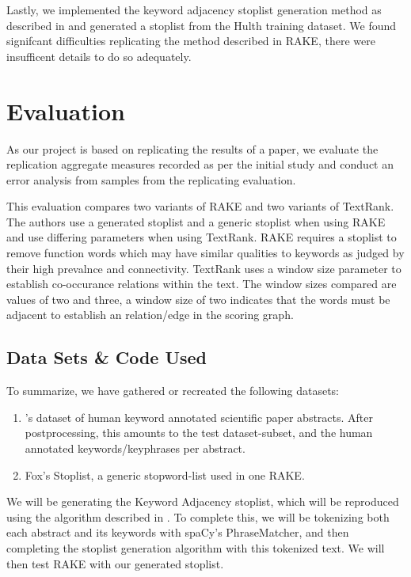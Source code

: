 \documentclass[11pt,a4paper]{article}
\begin{document}
Lastly, we implemented the keyword adjacency stoplist generation method as described in \citet{1} and generated a stoplist from the Hulth training dataset. We found signifcant difficulties replicating the method described in RAKE, there were insufficent details to do so adequately.  

\section{Evaluation}

As our project is based on replicating the results of a paper, we evaluate the replication aggregate measures recorded as per the initial study and conduct an error analysis from samples from the replicating evaluation. 

This evaluation compares two variants of RAKE and two variants of TextRank. The authors use a generated stoplist and a generic stoplist when using RAKE and use differing parameters when using TextRank. RAKE requires a stoplist to remove function words which may have similar qualities to keywords as judged by their high prevalnce and connectivity. TextRank uses a window size parameter to establish co-occurance relations within the text. The window sizes compared are values of two and three, a window size of two indicates that the words must be adjacent to establish an relation/edge in the scoring graph. 

\subsection{Data Sets \& Code Used}
To summarize, we have gathered or recreated the following datasets:

\begin{enumerate}
\item \citet{hulth-2003-improved}'s dataset of human keyword annotated scientific paper abstracts. After postprocessing, this amounts to the test dataset-subset, and the human annotated keywords/keyphrases per abstract.
\item Fox's Stoplist, a generic stopword-list used in one RAKE.
\end{enumerate}  

We will be generating the Keyword Adjacency stoplist, which will be reproduced using the algorithm described in \citet{hulth-2003-improved}. To complete this, we will be tokenizing both each abstract and its keywords with spaCy's PhraseMatcher, and then completing the stoplist generation algorithm with this tokenized text. We will then test RAKE with our generated stoplist.
\end{document}
